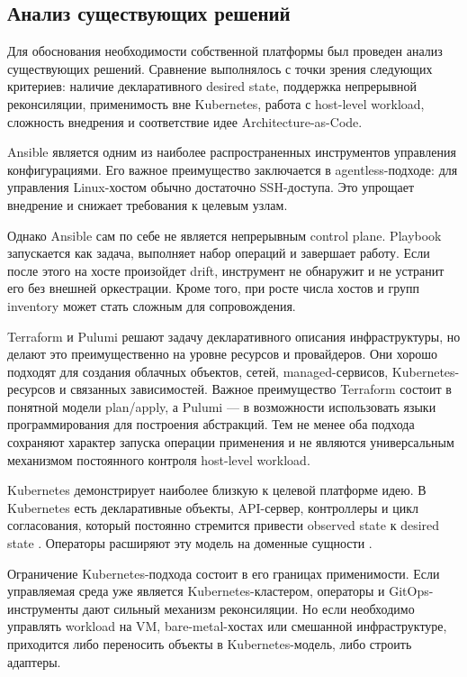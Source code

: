 \subsection{Анализ существующих решений}

Для обоснования необходимости собственной платформы был проведен анализ существующих решений. Сравнение выполнялось с точки зрения следующих критериев: наличие декларативного desired state, поддержка непрерывной реконсиляции, применимость вне Kubernetes, работа с host-level workload, сложность внедрения и соответствие идее Architecture-as-Code.

Ansible является одним из наиболее распространенных инструментов управления конфигурациями. Его важное преимущество заключается в agentless-подходе: для управления Linux-хостом обычно достаточно SSH-доступа. Это упрощает внедрение и снижает требования к целевым узлам.

Однако Ansible сам по себе не является непрерывным control plane. Playbook запускается как задача, выполняет набор операций и завершает работу. Если после этого на хосте произойдет drift, инструмент не обнаружит и не устранит его без внешней оркестрации. Кроме того, при росте числа хостов и групп inventory может стать сложным для сопровождения.

Terraform и Pulumi решают задачу декларативного описания инфраструктуры, но делают это преимущественно на уровне ресурсов и провайдеров. Они хорошо подходят для создания облачных объектов, сетей, managed-сервисов, Kubernetes-ресурсов и связанных зависимостей. Важное преимущество Terraform состоит в понятной модели plan/apply, а Pulumi --- в возможности использовать языки программирования для построения абстракций. Тем не менее оба подхода сохраняют характер запуска операции применения и не являются универсальным механизмом постоянного контроля host-level workload.

Kubernetes демонстрирует наиболее близкую к целевой платформе идею. В Kubernetes есть декларативные объекты, API-сервер, контроллеры и цикл согласования, который постоянно стремится привести observed state к desired state \cite{kubernetes_controllers,kubernetes_objects}. Операторы расширяют эту модель на доменные сущности \cite{kubernetes_operator_pattern}.

Ограничение Kubernetes-подхода состоит в его границах применимости. Если управляемая среда уже является Kubernetes-кластером, операторы и GitOps-инструменты дают сильный механизм реконсиляции. Но если необходимо управлять workload на VM, bare-metal-хостах или смешанной инфраструктуре, приходится либо переносить объекты в Kubernetes-модель, либо строить адаптеры.

